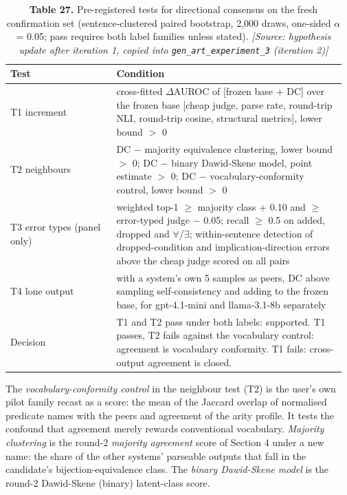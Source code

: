 \documentclass[11pt,letterpaper]{article}
\begin{document}
\begin{table}[H]
\centering
\small
\setlength{\tabcolsep}{3pt}
\caption*{\textbf{Table 27.} Pre-registered tests for directional consensus on the fresh confirmation set (sentence-clustered paired bootstrap, 2,000 draws, one-sided $\alpha$ = 0.05; pass requires both label families unless stated). \textit{[Source: hypothesis update after iteration 1, copied into \texorpdfstring{\textup{\nolinkurl{gen_art_experiment_3}}}{gen art experiment 3} (iteration 2)]}}
\begin{tabular}{>{\raggedright\arraybackslash}p{0.306\linewidth}>{\raggedright\arraybackslash}p{0.659\linewidth}}
\toprule
\textbf{Test} & \textbf{Condition} \\
\midrule
{}T1 increment & cross-fitted $\Delta$AUROC of [frozen base + DC] over the frozen base [cheap judge, parse rate, round-trip NLI, round-trip cosine, structural metrics], lower bound $>$ 0 \\
{}T2 neighbours & DC $-$ majority equivalence clustering, lower bound $>$ 0; DC $-$ binary Dawid-Skene model, point estimate $>$ 0; DC $-$ vocabulary-conformity control, lower bound $>$ 0 \\
{}T3 error types (panel only) & weighted top-1 $\geq$ majority class + 0.10 and $\geq$ error-typed judge $-$ 0.05; recall $\geq$ 0.5 on added, dropped and $\forall$/$\exists$; within-sentence detection of dropped-condition and implication-direction errors above the cheap judge scored on all pairs \\
{}T4 lone output & with a system's own 5 samples as peers, DC above sampling self-consistency and adding to the frozen base, for gpt-4.1-mini and llama-3.1-8b separately \\
{}Decision & T1 and T2 pass under both labels: supported. T1 passes, T2 fails against the vocabulary control: agreement is vocabulary conformity. T1 fails: cross-output agreement is closed. \\
\bottomrule
\end{tabular}
\end{table}

The \emph{vocabulary-conformity control} in the neighbour test (T2) is the user's own pilot family recast as a score: the mean of the Jaccard overlap of normalised predicate names with the peers and agreement of the arity profile. It tests the confound that agreement merely rewards conventional vocabulary. \emph{Majority clustering} is the round-2 \emph{majority agreement} score of Section 4 under a new name: the share of the other systems' parseable outputs that fall in the candidate's bijection-equivalence class. The \emph{binary Dawid-Skene model} is the round-2 Dawid-Skene (binary) latent-class score.
\end{document}
